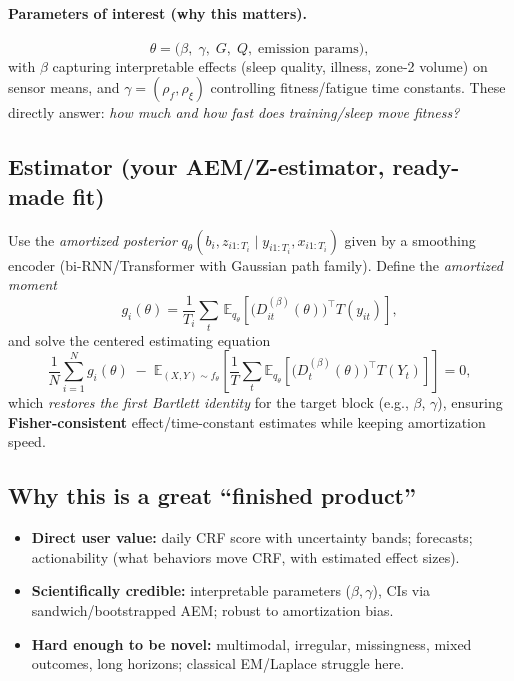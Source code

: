 \paragraph{Parameters of interest (why this matters).}
\[
\theta=\bigl(\beta,\;\gamma,\;G,\;Q,\;\text{emission params}\bigr),
\]
with \(\beta\) capturing interpretable effects (sleep quality, illness, zone-2 volume) on sensor means, and \(\gamma=(\rho_f,\rho_\xi)\) controlling fitness/fatigue time constants. These directly answer: \emph{how much and how fast does training/sleep move fitness?}

\subsection*{Estimator (your AEM/Z-estimator, ready-made fit)}
Use the \emph{amortized posterior} \(q_\theta(b_i,z_{i1:T_i}\mid y_{i1:T_i},x_{i1:T_i})\) given by a smoothing encoder (bi-RNN/Transformer with Gaussian path family). Define the \emph{amortized moment}
\[
g_i(\theta)=\frac{1}{T_i}\sum_t \,\mathbb{E}_{q_\theta}\!\left[\big(D_{it}^{(\beta)}(\theta)\big)^\top T(y_{it})\right],
\]
and solve the centered estimating equation
\[
\frac{1}{N}\sum_{i=1}^N g_i(\theta)
\;-\; \mathbb{E}_{(X,Y)\sim f_\theta}\!\left[\frac{1}{T}\sum_{t}\mathbb{E}_{q_\theta}\!\left[\big(D_t^{(\beta)}(\theta)\big)^\top T(Y_t)\right]\right]=0,
\]
which \emph{restores the first Bartlett identity} for the target block (e.g., \(\beta\), \(\gamma\)), ensuring \textbf{Fisher-consistent} effect/time-constant estimates while keeping amortization speed.

\subsection*{Why this is a great ``finished product''}
\begin{itemize}
\item \textbf{Direct user value:} daily CRF score with uncertainty bands; forecasts; actionability (what behaviors move CRF, with estimated effect sizes).
\item \textbf{Scientifically credible:} interpretable parameters (\(\beta,\gamma\)), CIs via sandwich/bootstrapped AEM; robust to amortization bias.
\item \textbf{Hard enough to be novel:} multimodal, irregular, missingness, mixed outcomes, long horizons; classical EM/Laplace struggle here.
\end{itemize}


